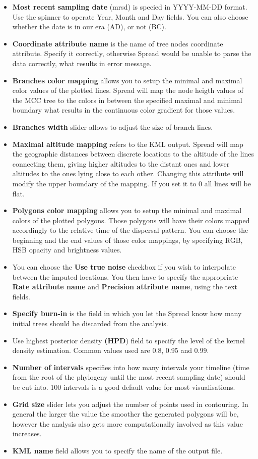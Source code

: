 \begin{itemize}
\item \textbf{Most recent sampling date }(mrsd) is specied in YYYY-MM-DD
format. Use the spinner to operate Year, Month and Day fields. You
can also choose whether the date is in our era (AD), or not (BC). 
\item \textbf{Coordinate attribute name} is the name of tree nodes coordinate
attribute. Specify it correctly, otherwise Spread would be unable
to parse the data correctly, what results in error message.
\item \textbf{Branches color mapping} allows you to setup the minimal and
maximal color values of the plotted lines. Spread will map the node
heigth values of the MCC tree to the colors in between the specified
maximal and minimal boundary what results in the continuous color
gradient for those values.
\item \textbf{Branches width} slider allows to adjust the size of branch
lines.
\item \textbf{Maximal altitude mapping} refers to the KML output. Spread
will map the geographic distances between discrete locations to the
altitude of the lines connecting them, giving higher altitudes to
the distant ones and lower altitudes to the ones lying close to each
other. Changing this attribute will modify the upper boundary of the
mapping. If you set it to 0 all lines will be flat.
\item \textbf{Polygons color mapping} allows you to setup the minimal and
maximal colors of the plotted polygons. Those polygons will have their
colors mapped accordingly to the relative time of the dispersal pattern.
You can choose the beginning and the end values of those color mappings,
by specifying RGB, HSB opacity and brightness values.
\item You can choose the \textbf{Use true noise} checkbox if you wish to
interpolate between the imputed locations. You then have to specify
the appropriate \textbf{Rate attribute name} and \textbf{Precision
attribute name}, using the text fields.
\item \textbf{Specify burn-in} is the field in which you let the Spread
know how many initial trees should be discarded from the analysis. 
\item Use highest posterior density \textbf{(HPD}) field to specify the
level of the kernel density estimation. Common values used are 0.8,
0.95 and 0.99.
\item \textbf{Number of intervals} specifies into how many intervals your
timeline (time from the root of the phylogeny until the most recent
sampling date) should be cut into. 100 intervals is a good default
value for most visualisations.
\item \textbf{Grid size} slider lets you adjust the number of points used
in contouring. In general the larger the value the smoother the generated
polygons will be, however the analysis also gets more computationally
involved as this value increases.
\item \textbf{KML name} field allows you to specify the name of the output
file.
\end{itemize}

